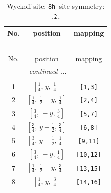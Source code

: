 \documentclass[fleqn,8pt]{jsarticle}
\begin{document}
\begin{longtable}{ccc}
\caption{Wyckoff site: {\tt 8h}, site symmetry: {\tt .2.}}
 \\
 \hline \hline
No. & position & mapping \\ \hline \endfirsthead

\multicolumn{2}{l}{\tablename\ \thetable{}} \\
 \hline \hline
No. & position & mapping \\ \hline \endhead

 \hline \hline
\multicolumn{2}{r}{\footnotesize\it continued ...} \\ \endfoot

 \hline \hline
\multicolumn{2}{r}{} \\ \endlastfoot

1 & $\left[ \frac{1}{4},\, y,\, \frac{1}{4} \right]$ & {\tt [1,3]} \\ \hline
2 & $\left[ \frac{1}{4},\, \frac{1}{2} - y,\, \frac{1}{4} \right]$ & {\tt [2,4]} \\ \hline
3 & $\left[ \frac{3}{4},\, - y,\, \frac{3}{4} \right]$ & {\tt [5,7]} \\ \hline
4 & $\left[ \frac{3}{4},\, y + \frac{1}{2},\, \frac{3}{4} \right]$ & {\tt [6,8]} \\ \hline
5 & $\left[ \frac{3}{4},\, y + \frac{1}{2},\, \frac{1}{4} \right]$ & {\tt [9,11]} \\ \hline
6 & $\left[ \frac{3}{4},\, - y,\, \frac{1}{4} \right]$ & {\tt [10,12]} \\ \hline
7 & $\left[ \frac{1}{4},\, \frac{1}{2} - y,\, \frac{3}{4} \right]$ & {\tt [13,15]} \\ \hline
8 & $\left[ \frac{1}{4},\, y,\, \frac{3}{4} \right]$ & {\tt [14,16]} \\
\end{longtable}
\renewcommand{\arraystretch}{1.2}
\end{document}
